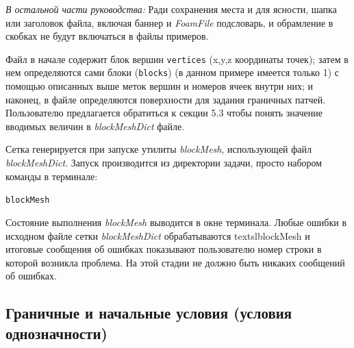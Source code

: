 \textit{В остальной части руководства:}
Ради сохранения места и для ясности, шапка или заголовок файла, включая баннер и \textsl{FoamFile} подсловарь,
 и обрамление в скобках не будут включаться в файлы примеров.

Файл в начале содержит блок вершин \texttt{vertices} (x,y,z координаты точек); затем в нем определяются сами блоки
 (\texttt{blocks})  (в данном примере имеется только 1) с помощью описанных выше меток вершин и номеров
 ячеек внутри них; и наконец, в файле определяются поверхности для задания граничных патчей.
 Пользователю предлагается обратиться к секции 5.3 чтобы понять значение вводимых  величин в \textsl{blockMeshDict} файле.

Сетка генерируется при запуске утилиты \textsl{blockMesh}, использующей файл \textsl{blockMeshDict}.
Запуск производится из директории задачи, просто набором команды в терминале:

\texttt{blockMesh}

Состояние выполнения \textsl{blockMesh} выводится в окне терминала. Любые ошибки в исходном 
файле сетки \textsl{blockMeshDict} обрабатываются textsl{blockMesh} и итоговые сообщения об ошибках показывают 
пользователю номер строки в которой возникла проблема. На этой стадии не должно быть никаких сообщений об ошибках.

\subsection{Граничные и начальные условия (условия однозначности)}
\label{sec:2.1.1.2}
